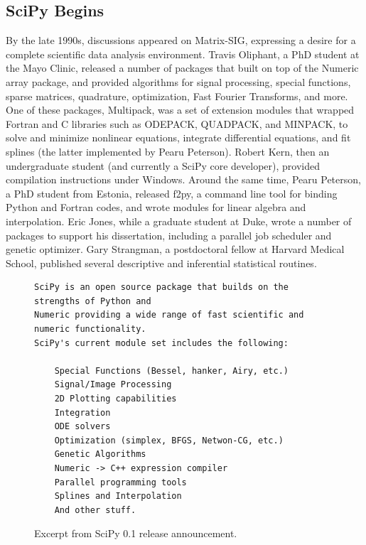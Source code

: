 \documentclass[fleqn,10pt]{wlscirep}
\begin{document}
\subsection*{SciPy Begins}

By the late 1990s, discussions appeared on Matrix-SIG,
expressing a desire for a complete scientific data analysis environment\cite{Travis-Keynote-2010}.
Travis Oliphant, a PhD student at the Mayo Clinic,
released a number of packages\cite{Travis-some-modules,Travis-enhance} 
that built on top of the Numeric array
package, and provided algorithms for signal processing, special
functions, sparse matrices, quadrature, optimization, Fast Fourier
Transforms, and more.  One of these packages, Multipack, was a set of
extension modules that wrapped Fortran and C libraries such as
ODEPACK, QUADPACK, and MINPACK, to solve and minimize nonlinear
equations, integrate differential equations, and fit splines (the
latter implemented by Pearu Peterson).  Robert Kern, then an
undergraduate student (and currently a SciPy core developer), provided
compilation instructions under Windows.
Around the same time, Pearu Peterson, a PhD student from Estonia,
released f2py\cite{Pearu-f2py-mail}, a command line tool for binding Python and Fortran
codes, and wrote modules for linear algebra and interpolation.
Eric Jones, while a graduate student at Duke, wrote a number of
packages to support his dissertation, including a parallel job
scheduler and genetic optimizer.
%
%
Gary Strangman, a postdoctoral fellow at Harvard Medical School,
published several descriptive and inferential statistical 
routines\cite{Strangman-modules}.

\begin{figure}
\begin{verbatim}
SciPy is an open source package that builds on the strengths of Python and
Numeric providing a wide range of fast scientific and numeric functionality.
SciPy's current module set includes the following:

    Special Functions (Bessel, hanker, Airy, etc.)
    Signal/Image Processing
    2D Plotting capabilities
    Integration
    ODE solvers
    Optimization (simplex, BFGS, Netwon-CG, etc.)
    Genetic Algorithms
    Numeric -> C++ expression compiler
    Parallel programming tools
    Splines and Interpolation
    And other stuff.
\end{verbatim}
\caption{Excerpt from SciPy 0.1 release announcement.}\label{fig:announce-0.1}
\end{figure}
\end{document}
